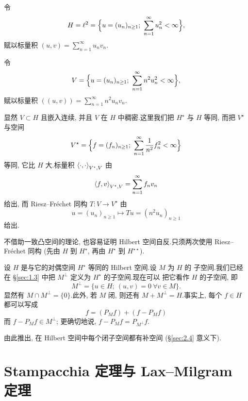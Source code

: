 令
\begin{equation*}
H=\ell^2=\Bigl\{u=(u_n)_{n\ge1};\ \sum_{n=1}^\infty u_n^2<\infty\Bigr\},
\end{equation*}
赋以标量积 $(u,v)=\sum_{n=1}^\infty u_nv_n$.

令
\begin{equation*}
V=\Bigl\{u=(u_n)_{n\ge1};\ \sum_{n=1}^\infty n^2u_n^2<\infty\Bigr\},
\end{equation*}
赋以标量积 $((u,v))=\sum_{n=1}^\infty n^2u_nv_n$.

显然 $V\subset H$ 且嵌入连续, 并且 $V$ 在 $H$ 中稠密.这里我们把 $H^\star$ 与
$H$ 等同, 而把 $V^\star$ 与空间
\begin{equation*}
V^\star=\Bigl\{f=(f_n)_{n\ge1};\ \sum_{n=1}^\infty\frac{1}{n^2}f_n^2
<\infty\Bigr\}
\end{equation*}
等同, 它比 $H$ 大.标量积 $\left\langle \cdot,\cdot\right\rangle_{V^\star,V}$ 由
\begin{equation*}
\left\langle f,v\right\rangle_{V^\star,V}=\sum_{n=1}^\infty f_nv_n
\end{equation*}
给出, 而 Riesz--Fréchet 同构 $T:V\to V^\star$ 由
\begin{equation*}
u=(u_n)_{n\ge1}\mapsto Tu=(n^2u_n)_{n\ge1}
\end{equation*}
给出.

\begin{remark}
\label{rem:5.4}
不借助一致凸空间的理论, 也容易证明 Hilbert 空间自反.只须两次使用
Riesz--Fréchet 同构 (先由 $H$ 到 $H^\star$, 再由 $H^\star$ 到 $H^{\star\star}$).
\end{remark}

\begin{remark}
\label{rem:5.5}
设 $H$ 是与它的对偶空间 $H^\star$ 等同的 Hilbert 空间.设 $M$ 为 $H$ 的
子空间.我们已经在 \S\ref{sec:1.3} 中把 $M^\perp$ 定义为 $H^\star$ 的子空间.现在可以
把它看作 $H$ 的子空间, 即
\begin{equation*}
M^\perp=\{u\in H;\ (u,v)=0\ \forall v\in M\}.
\end{equation*}
显然有 $M\cap M^\perp=\{0\}$.此外, 若 $M$ 闭, 则还有
$M+M^\perp=H$.事实上, 每个 $f\in H$ 都可以写成
\begin{equation*}
f=(P_Mf)+(f-P_Mf)
\end{equation*}
而 $f-P_Mf\in M^\perp$; 更确切地说, $f-P_Mf=P_{M^\perp}f$.

由此推出, 在 Hilbert 空间中每个闭子空间都有补空间 (\S\ref{sec:2.4} 意义下).
\end{remark}
\section{
Stampacchia 定理与 
Lax--Milgram 定理}
\label{sec:5.3}

